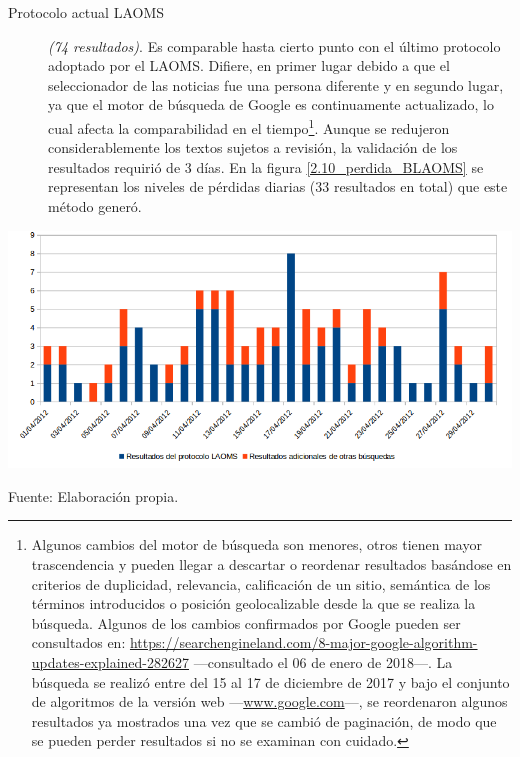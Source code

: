 \documentclass[letterpaper, 11pt]{book}
\theoremstyle{definition}
\theoremstyle{remark}
\begin{document}
\begin{description}
    \item[Protocolo actual LAOMS] \emph{(74 resultados)}. Es comparable hasta cierto punto con el último protocolo adoptado por el LAOMS. 
    Difiere, en primer lugar debido a que el seleccionador de las noticias fue una persona diferente y en segundo lugar, ya que el motor de búsqueda de Google es continuamente actualizado, lo cual afecta la comparabilidad en el tiempo\footnote{
	Algunos cambios del motor de búsqueda son menores, otros tienen mayor trascendencia y pueden llegar a descartar o reordenar resultados basándose en criterios de duplicidad, relevancia, calificación de un sitio, semántica de los términos introducidos o posición geolocalizable desde la que se realiza la búsqueda. 
	Algunos de los cambios confirmados por Google pueden ser consultados en: \url{https://searchengineland.com/8-major-google-algorithm-updates-explained-282627} ---consultado el 06 de enero de 2018---.
	La búsqueda se realizó entre del 15 al 17 de diciembre de 2017 y bajo el conjunto de algoritmos de la versión web ---\url{www.google.com}---, se reordenaron algunos resultados ya mostrados una vez que se cambió de paginación, de modo que se pueden perder resultados si no se examinan con cuidado. 
    }. 
    Aunque se redujeron considerablemente los textos sujetos a revisión, la validación de los resultados requirió de 3 días. En la figura \ref{2.10_perdida_BLAOMS} se representan los niveles de pérdidas diarias (33 resultados en total) que este método generó.
\end{description}
    
\hspace{-0.5em}\begin{minipage}{\linewidth}
\centering
{} \label{2.10_perdida_BLAOMS}
\hspace{-2em}\includegraphics[scale=0.41]{img/2.10_perdida_BLAOMS.png}
\par\bigskip
\small Fuente: Elaboración propia.
\end{minipage}\bigskip
\end{document}
